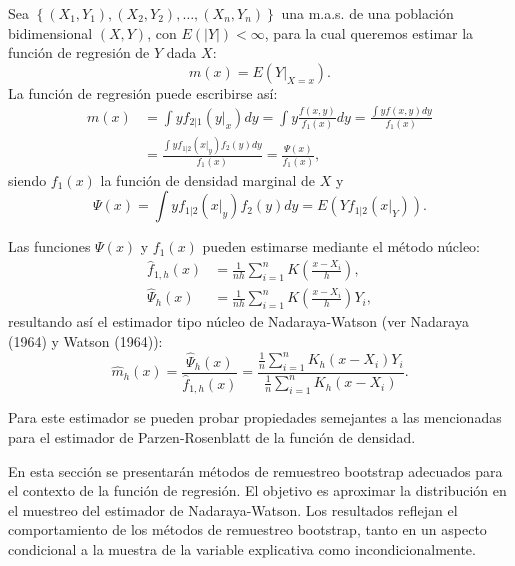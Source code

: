 \documentclass[]{book}
\theoremstyle{definition}
\theoremstyle{definition}
\theoremstyle{definition}
\theoremstyle{remark}
\begin{document}
Sea
\(\left\{ \left( X_1,Y_1 \right),\left( X_2,Y_2 \right),\ldots ,\left( X_n,Y_n \right) \right\}\)
una m.a.s. de una población bidimensional \(\left( X,Y \right)\), con
\(E\left( \left\vert Y\right\vert  \right) <\infty\), para la cual
queremos estimar la función de regresión de \(Y\) dada \(X\):
\[m\left( x \right) =E\left( \left. Y\right\vert_{X=x} \right).\] La
función de regresión puede escribirse así: \[\begin{aligned}
m\left( x \right) &= \int yf_{2|1}\left( \left. y\right\vert _{x} \right)
dy=\int y\frac{f\left( x,y \right)}{f_1\left( x \right)}dy=\frac{\int
yf\left( x,y \right) dy}{f_1\left( x \right)} \\
&= \frac{\int yf_{1|2}\left( \left. x\right\vert _{y} \right) f_2\left(
y \right) dy}{f_1\left( x \right)}=\frac{\Psi \left( x \right)}{f_1\left(
x \right)},
\end{aligned}\] siendo \(f_1\left( x \right)\) la función de densidad
marginal de \(X\) y
\[\Psi \left( x \right) =\int yf_{1|2}\left( \left. x\right\vert _{y} \right)
f_2\left( y \right) dy=E\left( Yf_{1|2}\left( \left. x\right\vert_{Y} \right)
\right).\]

Las funciones \(\Psi \left( x \right)\) y \(f_1\left( x \right)\) pueden
estimarse mediante el método núcleo: \[\begin{aligned}
\hat{f}_{1,h}\left( x \right) &= \frac{1}{nh}\sum_{i=1}^{n}K\left( \frac{
x-X_i}{h} \right), \\
\hat{\Psi}_{h}\left( x \right) &= \frac{1}{nh}\sum_{i=1}^{n}K\left( \frac{
x-X_i}{h} \right) Y_i,
\end{aligned}\] resultando así el estimador tipo núcleo de
Nadaraya-Watson (ver Nadaraya (1964) y Watson (1964)):
\[\hat{m}_{h}\left( x \right) =\frac{\hat{\Psi}_{h}\left( x \right)}{\hat{f}
_{1,h}\left( x \right)}=\frac{\frac{1}{n}\sum_{i=1}^{n}K_{h}\left(
x-X_i \right) Y_i}{\frac{1}{n}\sum_{i=1}^{n}K_{h}\left( x-X_i \right)}.\]

Para este estimador se pueden probar propiedades semejantes a las
mencionadas para el estimador de Parzen-Rosenblatt de la función de
densidad.

En esta sección se presentarán métodos de remuestreo bootstrap adecuados
para el contexto de la función de regresión. El objetivo es aproximar la
distribución en el muestreo del estimador de Nadaraya-Watson. Los
resultados reflejan el comportamiento de los métodos de remuestreo
bootstrap, tanto en un aspecto condicional a la muestra de la variable
explicativa como incondicionalmente.
\end{document}
